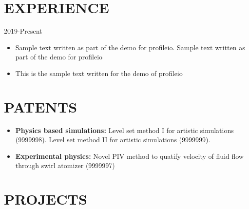 \documentclass{res}
\begin{document}
\begin{resume}
	
	
	\section{\MakeUppercase{Experience}} \vskip 0.15in
	
	\hspace*{-0.25in}{\bf Research Assistant} \hfill 2019-Present \\
	\hspace*{-0.25in}{\it Texas A\textbackslash \&M University, College, TX}
	\begin{itemize}[leftmargin=\parindent]
	\setlength{\itemsep}{0mm} \smallskip
	
		\item Sample text written as part of the demo for profileio. Sample text written as part of the demo for profileio
		\item This is the sample text written for the demo of profileio
	\end{itemize}
	
	
	
	
	\section{\MakeUppercase{Patents}} \vskip 0.35in
	\begin{itemize}[leftmargin=\parindent]
	\setlength{\itemsep}{6pt}
	
		\item[] {\bf Physics based simulations:} Level set method I for artistic simulations (9999998). Level set method II for artistic simulations (9999999).
		\item[] {\bf Experimental physics:} Novel PIV method to quatify velocity of fluid flow through swirl atomizer (9999997)
	\end{itemize}
	
		
	
	\section{\MakeUppercase{Projects}} \vskip 0.15in
	

\end{resume}
\end{document}

